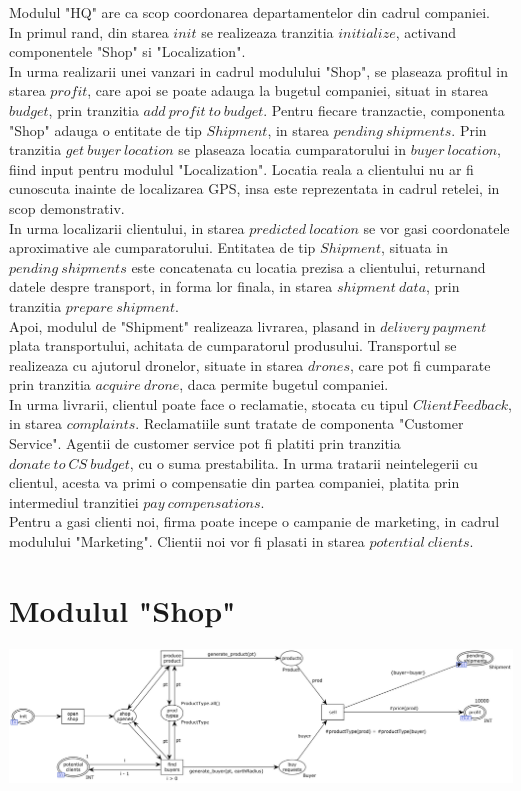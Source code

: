 \begin{spacing}{1.5}
Modulul "HQ" are ca scop coordonarea departamentelor din cadrul companiei.\\
In primul rand, din starea $init$ se realizeaza tranzitia $initialize$, activand componentele "Shop" si
"Localization".\\
In urma realizarii unei vanzari in cadrul modulului "Shop", se plaseaza profitul in starea $profit$, care
apoi se poate adauga la bugetul companiei, situat in starea $budget$, prin tranzitia $add\ profit\ to\ budget$.
Pentru fiecare tranzactie, componenta "Shop" adauga o entitate de tip $Shipment$, in starea
$pending\ shipments$. Prin tranzitia $get\ buyer\ location$ se plaseaza locatia cumparatorului in
$buyer\ location$, fiind input pentru modulul "Localization". Locatia reala a clientului nu ar fi cunoscuta
inainte de localizarea GPS, insa este reprezentata in cadrul retelei, in scop demonstrativ.\\
In urma localizarii clientului, in starea $predicted\ location$ se vor gasi coordonatele aproximative ale
cumparatorului. Entitatea de tip $Shipment$, situata in $pending\ shipments$ este concatenata cu locatia
prezisa a clientului, returnand datele despre transport, in forma lor finala, in starea $shipment\ data$,
prin tranzitia $prepare\ shipment$.\\
Apoi, modulul de "Shipment" realizeaza livrarea, plasand in $delivery\ payment$ plata transportului, achitata
de cumparatorul produsului. Transportul se realizeaza cu ajutorul dronelor, situate in starea $drones$,
care pot fi cumparate prin tranzitia $acquire\ drone$, daca permite bugetul companiei.\\
In urma livrarii, clientul poate face o reclamatie, stocata cu tipul $ClientFeedback$, in starea $complaints$.
Reclamatiile sunt tratate de componenta "Customer Service". Agentii de customer service pot fi platiti prin
tranzitia $donate\ to\ CS\ budget$, cu o suma prestabilita. In urma tratarii neintelegerii cu clientul,
acesta va primi o compensatie din partea companiei, platita prin intermediul tranzitiei $pay\ compensations$.\\
Pentru a gasi clienti noi, firma poate incepe o campanie de marketing, in cadrul modulului "Marketing".
Clientii noi vor fi plasati in starea $potential\ clients$.

\section{Modulul "Shop"}

\includegraphics[width=\textwidth]{./Parts/Chapter1/Shop.png}


\end{spacing}
